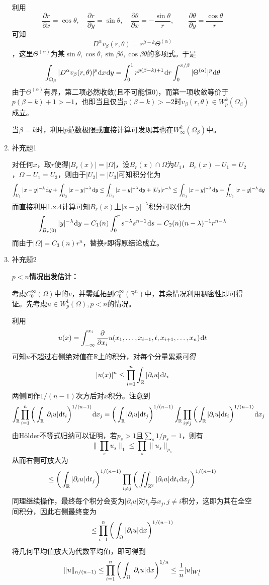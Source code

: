 \documentclass[a4paper,UTF8,fontset=windows,10pt]{ctexart}
\newcommand*{\dr}{\hspace{0.07em}\mathrm{d}}
\begin{document}
\begin{enumerate}
    利用
    $$\frac{\partial r}{\partial x}=\cos\theta,\quad\frac{\partial r}{\partial y}=\sin\theta,\quad\frac{\partial\theta}{\partial x}=-\frac{\sin\theta}{r},\quad\quad\frac{\partial\theta}{\partial y}=\frac{\cos\theta}{r}$$
    可知
    $$D^\alpha v_\beta(r,\theta)=r^{\beta-k}\Theta^{(\alpha)}$$，这里$\Theta^{(\alpha)}$为某$\sin\theta,\cos\theta,\sin\beta\theta,\cos\beta\theta$的多项式。于是
    $$\int_{\Omega_\beta}|D^\alpha v_\beta(r,\theta)|^p\dr x\dr y=\int_0^1r^{p(\beta-k)+1}\dr r\int_0^{\pi/\beta}|\Theta^{(\alpha)}|^p\dr\theta$$
    由于$\Theta^{(\alpha)}$有界，第二项必然收敛(且不可能恒0)，而第一项收敛等价于$p(\beta-k)+1>-1$，也即当且仅当$p(\beta-k)>-2$时$v_\beta(r,\theta)\in W_p^k(\Omega_\beta)$成立。
    
    当$\beta=k$时，利用$p$范数极限或直接计算可发现其也在$W_\infty^k(\Omega_\beta)$中。
    
    \item 补充题1
    
    对任何$x$，取$r$使得$|B_r(x)|=|\Omega|$，设$B_r(x)\cap\Omega$为$U_1$，$B_r(x)-U_1=U_2$，$\Omega-U_1=U_3$，则由于$|U_2|=|U_3|$可知积分化为
    $$\int_{U_1}|x-y|^{-\lambda}\dr y+\int_{U_3}|x-y|^{-\lambda}\dr y\le \int_{U_1}|x-y|^{-\lambda}\dr y+|U_3|r^{-\lambda}\le\int_{U_1}|x-y|^{-\lambda}\dr y+\int_{U_2}|x-y|^{-\lambda}\dr y$$
    而直接利用1.x.4计算可知$B_r(x)$上$|x-y|^{-\lambda}$积分可以化为
    $$\int_{B_r(0)}|y|^{-\lambda}\dr y=C_1(n)\int_0^rs^{-\lambda}s^{n-1}\dr s=C_2(n)(n-\lambda)^{-1}r^{n-\lambda}$$
    而由于$|\Omega|=C_3(n)r^n$，替换$r$即得原结论成立。
    
    \item 补充题2
    
    \textbf{$p<n$情况出发估计：}
    
    考虑$C_0^\infty(\Omega)$中的$v$，并零延拓到$C_0^\infty(\mathbb{R}^n)$中，其余情况利用稠密性即可得证。先考虑$u\in W_p^1(\Omega),p<n$的情况。
    
    利用
    $$u(x)=\int_{-\infty}^{x_i}\frac{\partial}{\partial x_i}u(x_1,\dots,x_{i-1},t,x_{i+1},\dots,x_n)\dr t$$
    可知$u$不超过右侧绝对值在$\mathbb{R}$上的积分，对每个分量累乘可得
    $$|u(x)|^n\le\prod_{i=1}^n\int_{\mathbb{R}}|\partial_iu|\dr t_i$$
    两侧同作$1/(n-1)$次方后对$x$积分。注意到
    $$\int_{\mathbb{R}}\prod_{i=1}^n\bigg(\int_{\mathbb{R}}|\partial_iu|\dr t_i\bigg)^{1/(n-1)}\dr x_j=\bigg(\int_{\mathbb{R}}|\partial_iu|\dr t_j\bigg)^{1/(n-1)}\int_{\mathbb{R}}\prod_{i\ne j}\bigg(\int_{\mathbb{R}}|\partial_iu|\dr t_i\bigg)^{1/(n-1)}\dr x_j$$
    由H\"older不等式归纳可以证明，若$p_s>1$且$\sum_s1/p_s=1$，则有
    $$\bigg\|\prod_su_s\bigg\|_1\le\prod_s\|u_s\|_{p_s}$$
    从而右侧可放大为
    $$\le\bigg(\int_{\mathbb{R}}|\partial_iu|\dr t_j\bigg)^{1/(n-1)}\prod_{i\ne j}\bigg(\iint_{\mathbb{R}^2}|\partial_iu|\dr t_i\dr x_j\bigg)^{1/(n-1)}$$
    同理继续操作，最终每个积分会变为$|\partial_iu|$对$t_i$与$x_j,j\ne i$积分，这即为其在全空间积分，因此右侧最终变为
    $$\le\prod_{i=1}^n\bigg(\int_\Omega|\partial_iu|\dr x\bigg)^{1/(n-1)}$$
    将几何平均值放大为代数平均值，即可得到
    $$\|u\|_{n/(n-1)}\le\prod_{i=1}^n\bigg(\int_\Omega|\partial_iu|\dr x\bigg)^{1/n}\le\frac{1}{n}|u|_{W_1^1}$$
    

\end{enumerate}
\end{document}
